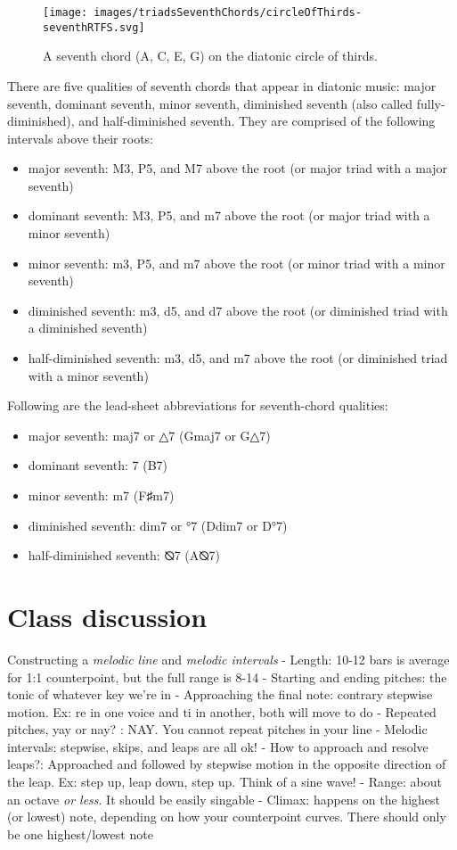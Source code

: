 \documentclass{book}
\providecommand{\tightlist}{%
  \setlength{\itemsep}{0pt}\setlength{\parskip}{0pt}}
\begin{document}
\begin{figure}
\centering
\texttt{[image: images/triadsSeventhChords/circleOfThirds-seventhRTFS.svg]}
\caption{A seventh chord (A, C, E, G) on the diatonic circle of thirds.}
\end{figure}

There are five qualities of seventh chords that appear in diatonic music:
major seventh, dominant seventh, minor seventh, diminished seventh (also
called fully-diminished), and half-diminished seventh. They are comprised of
the following intervals above their roots:

\begin{itemize}
\tightlist
\item
  major seventh: M3, P5, and M7 above the root (or major triad with a major
  seventh)
\item
  dominant seventh: M3, P5, and m7 above the root (or major triad with a minor
  seventh)
\item
  minor seventh: m3, P5, and m7 above the root (or minor triad with a minor
  seventh)
\item
  diminished seventh: m3, d5, and d7 above the root (or diminished triad with
  a diminished seventh)
\item
  half-diminished seventh: m3, d5, and m7 above the root (or diminished triad
  with a minor seventh)
\end{itemize}

Following are the lead-sheet abbreviations for seventh-chord qualities:

\begin{itemize}
\tightlist
\item
  major seventh: maj7 or △7 (Gmaj7 or G△7)
\item
  dominant seventh: 7 (B7)
\item
  minor seventh: m7 (F♯m7)
\item
  diminished seventh: dim7 or °7 (Ddim7 or D°7)
\item
  half-diminished seventh: ⦰7 (A⦰7)
\end{itemize}

\hypertarget{class-discussion-29}{%
\section{Class discussion}\label{class-discussion-29}}

Constructing a \emph{melodic line} and \emph{melodic intervals} - Length:
10-12 bars is average for 1:1 counterpoint, but the full range is 8-14 -
Starting and ending pitches: the tonic of whatever key we're in - Approaching
the final note: contrary stepwise motion. Ex: re in one voice and ti in
another, both will move to do - Repeated pitches, yay or nay? : NAY. You
cannot repeat pitches in your line - Melodic intervals: stepwise, skips, and
leaps are all ok! - How to approach and resolve leaps?: Approached and
followed by stepwise motion in the opposite direction of the leap. Ex: step
up, leap down, step up. Think of a sine wave! - Range: about an octave
\emph{or less}. It should be easily singable - Climax: happens on the highest
(or lowest) note, depending on how your counterpoint curves. There should only
be one highest/lowest note
\end{document}

